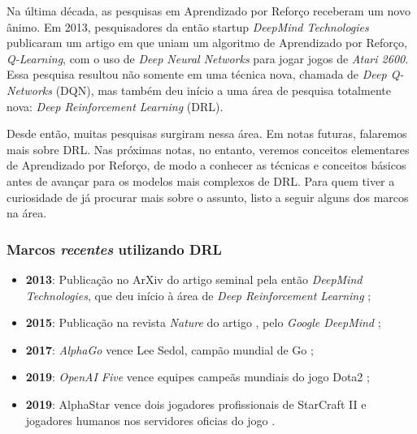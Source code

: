 \documentclass{article}
\begin{document}
            Na última década, as pesquisas em Aprendizado por Reforço receberam um novo ânimo. Em 2013, pesquisadores da então startup \emph{DeepMind Technologies} publicaram um artigo em que uniam um algoritmo de Aprendizado por Reforço, \emph{Q-Learning}, com o uso de \emph{Deep Neural Networks} para jogar jogos de \emph{Atari 2600}. Essa pesquisa resultou não somente em uma técnica nova, chamada de \emph{Deep Q-Networks} (DQN), mas também deu início a uma área de pesquisa totalmente nova: \emph{Deep Reinforcement Learning} (DRL). 
            
            Desde então, muitas pesquisas surgiram nessa área. Em notas futuras, falaremos mais sobre DRL. Nas próximas notas, no entanto, veremos conceitos elementares de Aprendizado por Reforço, de modo a conhecer as técnicas e conceitos básicos antes de avançar para os modelos mais complexos de DRL. Para quem tiver a curiosidade de já procurar mais sobre o assunto, listo a seguir alguns dos marcos na área.
            
            \subsubsection{Marcos \emph{recentes} utilizando DRL}
            
                \begin{itemize}
                
                    \item \textbf{2013}: Publicação no ArXiv do artigo seminal \emph{} pela então \emph{DeepMind Technologies}, que deu início à área de \emph{Deep Reinforcement Learning} \cite{Mnih2013};
                    
                    \item \textbf{2015}: Publicação na revista \emph{Nature} do artigo \emph{}, pelo \emph{Google DeepMind} \cite{Mnih2015};
                    
                    \item \textbf{2017}: \emph{AlphaGo} vence Lee Sedol, campão mundial de Go \cite{Silver2016,AlphaGo2017};
                    
                    \item \textbf{2019}: \emph{OpenAI Five} vence equipes campeãs mundiais do jogo Dota2 \cite{Openai2019};
                    
                    \item \textbf{2019}: AlphaStar vence dois jogadores profissionais de StarCraft II e jogadores humanos nos servidores oficias do jogo \cite{Vinyals2019}.
                    
                \end{itemize}
\end{document}
